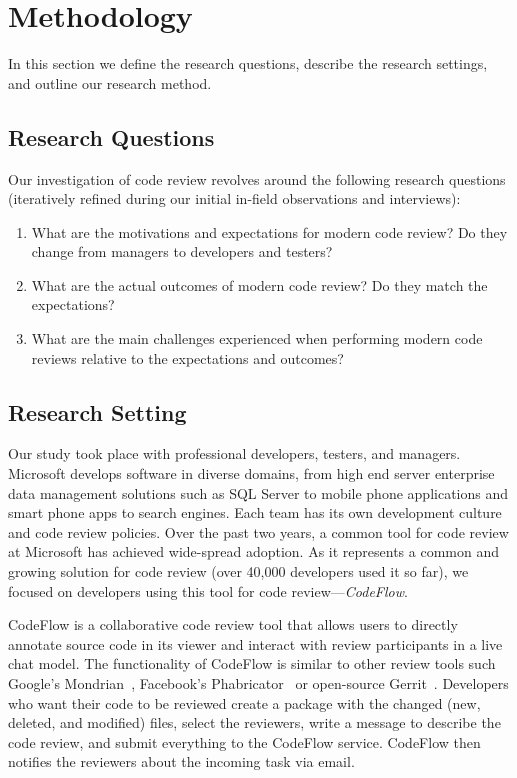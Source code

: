 
\section{Methodology} \label{sec:methodology}


In this section we define the research questions, describe the research
settings, and outline our research method.

\subsection{Research Questions}

Our investigation of code review revolves around the following research
questions (iteratively refined during our initial in-field
observations and interviews):

\begin{enumerate}
  \item What are the motivations and expectations for modern code review? Do they change from managers to developers and testers?
  \item What are the actual outcomes of modern code review? Do they match the expectations?
  \item What are the main challenges experienced when performing modern code reviews relative to the expectations and outcomes?
\end{enumerate}

\subsection{Research Setting}

Our study took place with professional developers, testers, and managers.
Microsoft develops software in diverse domains, from high end server enterprise
data management solutions such as SQL Server to mobile phone applications and
smart phone apps to search engines. Each team has its own development culture
and code review policies. Over the past two years, a common tool for code
review at Microsoft has achieved wide-spread adoption. As it represents a
common and growing solution for code review (over 40,000 developers used it so
far), we focused on developers using this tool for code review---\emph{CodeFlow}. 

CodeFlow is a collaborative code review tool that allows users to directly
annotate source code in its viewer and interact with review participants in a
live chat model. The functionality of CodeFlow is similar to other review tools
such Google's Mondrian~\cite{kennedy2006online}, Facebook's Phabricator~\cite{tsotsis2011online} or
open-source Gerrit~\cite{gerrit2012online}. Developers who want their code to
be reviewed create a package with the changed (new, deleted, and modified)
files, select the reviewers, write a message to describe the code review, and
submit everything to the CodeFlow service. CodeFlow then notifies the reviewers
about the incoming task via email.



